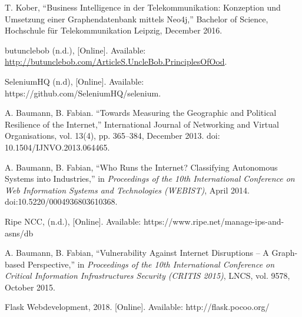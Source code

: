 \documentclass[conference, 11pt]{IEEEtran}
\begin{document}
\begin{thebibliography}{00}
T. Kober, ``Business Intelligence in der Telekommunikation: Konzeption und Umsetzung einer Graphendatenbank mittels Neo4j,'' Bachelor of Science, Hochschule für Telekommunikation Leipzig, December 2016. %

 butunclebob (n.d.), [Online]. Available: \url{http://butunclebob.com/ArticleS.UncleBob.PrinciplesOfOod}. %


SeleniumHQ (n.d), [Online]. Available: https://github.com/SeleniumHQ/selenium. %


A. Baumann, B. Fabian. ``Towards Measuring the Geographic and Political Resilience of the Internet,'' International Journal of Networking and Virtual Organisations, vol. 13(4), pp. 365–384, December 2013. doi: 10.1504/IJNVO.2013.064465. %

 A. Baumann, B. Fabian, ``Who Runs the Internet? Classifying Autonomous Systems into Industries,'' in \textit{Proceedings of the 10th International Conference on Web Information Systems and Technologies (WEBIST)}, April 2014. doi:10.5220/0004936803610368. %

Ripe NCC, (n.d.), [Online]. Available: https://www.ripe.net/manage-ips-and-asns/db %

A. Baumann, B. Fabian, ``Vulnerability Against Internet Disruptions – A Graph-based Perspective,''  in \textit{Proceedings of the 10th International Conference on Critical Information Infrastructures Security (CRITIS 2015)}, LNCS, vol. 9578, October 2015.

Flask Webdevelopment, 2018. [Online]. Available: http://flask.pocoo.org/
\end{thebibliography}
\end{document}
